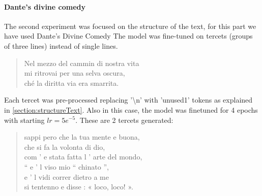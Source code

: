 \documentclass[10pt,twocolumn,letterpaper]{article}
\begin{document}
\paragraph{Dante's divine comedy} The second experiment was focused on the structure of the text,
for this part we have used Dante's Divine Comedy
The model was fine-tuned on tercets (groups of three lines) instead of single lines.
\begin{quote}
   Nel mezzo del cammin di nostra vita\\
   mi ritrovai per una selva oscura,\\
   ché la diritta via era smarrita.\\
\end{quote}
Each tercet was pre-processed replacing '\textbackslash n' with 'unused1' tokens as explained in \ref{section:structureText}.
Also in this case, the model was finetuned for 4 epochs with starting $lr=5e^{-5}$. These are 2 tercets generated:

\begin{quote}
%
%
sappi pero che la tua mente e buona,\\
che si fa la volonta di dio,\\
com ’ e stata fatta l ’ arte del mondo,\\

“ e ’ l viso mio “ chinato ”,\\
e ’ l vidi correr dietro a me\\
si tentenno e disse : « loco, loco! ».\\
%
\end{quote}
\end{document}
